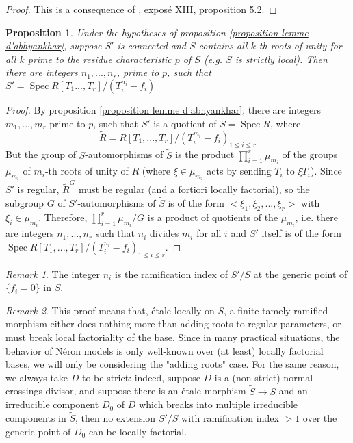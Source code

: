 \documentclass{article}
\DeclareMathOperator{\spec}{Spec}
\newtheorem{prop}[thm]{Proposition}
\theoremstyle{definition}
\theoremstyle{remark}
\newtheorem{rem}{Remark}[thm]
\begin{document}
\begin{proof}
This is a consequence of \cite{SGA1}, exposé XIII, proposition 5.2.
\end{proof}

\begin{prop}\label{proposition tamely ramified maps etale-locally only add roots}
Under the hypotheses of proposition \ref{proposition lemme d'abhyankhar}, suppose $S'$ is connected and $S$ contains all $k$-th roots of unity for all $k$ prime to the residue characteristic $p$ of $S$ (e.g. $S$ is strictly local). Then there are integers $n_1,...,n_r$, prime to $p$, such that $S'=\spec R[T_1...,T_r]/(T_i^{n_i}-f_i)$
\end{prop}


\begin{proof}
By proposition \ref{proposition lemme d'abhyankhar}, there are integers $m_1,...,m_r$ prime to $p$, such that $S'$ is a quotient of $\tilde{S}=\spec\tilde{R}$, where
\[
\tilde{R}=R[T_1,...,T_r]/(T_i^{m_i}-f_i)_{1\leq i\leq r}
\]
But the group of $S$-automorphisms of $\tilde{S}$ is the product $\prod\limits_{i=1}^r \mu_{m_i}$ of the groups $\mu_{m_i}$ of $m_i$-th roots of unity of $R$ (where $\xi\in\mu_{m_i}$ acts by sending $T_i$ to $\xi T_i$). Since $S'$ is regular, $\tilde{R}^G$ must be regular (and a fortiori locally factorial), so the subgroup $G$ of $S'$-automorphisms of $\tilde{S}$ is of the form $<\xi_1,\xi_2,...,\xi_r>$ with $\xi_i\in\mu_{m_i}$. Therefore, $\prod\limits_{i=1}^r \mu_{m_i}/G$ is a product of quotients of the $\mu_{m_i}$, i.e. there are integers $n_1,...,n_r$ such that $n_i$ divides $m_i$ for all $i$ and $S'$ itself is of the form $\spec R[T_1,...,T_r]/(T_i^{n_i}-f_i)_{1\leq i\leq r}$.
\end{proof}

\begin{rem}
The integer $n_i$ is the ramification index of $S'/S$ at the generic point of $\{f_i=0\}$ in $S$.
\end{rem}

\begin{rem}
This proof means that, \'etale-locally on $S$, a finite tamely ramified morphism either does nothing more than adding roots to regular parameters, or must break local factoriality of the base. Since in many practical situations, the behavior of N\'eron models is only well-known over (at least) locally factorial bases, we will only be considering the "adding roots" case. For the same reason, we always take $D$ to be strict: indeed, suppose $D$ is a (non-strict) normal crossings divisor, and suppose there is an \'etale morphism $\tilde{S}\longrightarrow S$ and an irreducible component $D_0$ of $D$ which breaks into multiple irreducible components in $\tilde{S}$, then no extension $S'/S$ with ramification index $>1$ over the generic point of $D_0$ can be locally factorial.
\end{rem}
\end{document}
